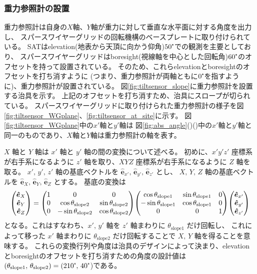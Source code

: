 \documentclass[../../main.tex]{subfiles}
\begin{document}
\subsubsection{重力参照計の設置}
\label{subsubsec:wg_tiltsensor_slope}
重力参照計は自身の$X$軸、$Y$軸が重力に対して垂直な水平面に対する角度を出力し、
スパースワイヤーグリッドの回転機構のベースプレートに取り付けられている。
SATはelevation(地表から天頂に向かう仰角)$50\tcdegree$での観測を主要としており、
スパースワイヤーグリッドはboresight(視線軸を中心とした回転角)$60\tcdegree$のオフセットを持って設置されている。
そのため、これらelevationとboresightのオフセットを打ち消すように
(つまり、重力参照計が両軸ともに$0\tcdegree$を指すように)、重力参照計が設置されている。
図\ref{fig:tiltsensor_slope}に重力参照計を設置する治具を示す。
上記のオフセットを打ち消すため、治具にスロープが切られている。
スパースワイヤーグリッドに取り付けられた重力参照計の様子を図\ref{fig:tiltsensor_WGplane}、\ref{fig:tiltsensor_at_site}に示す。
図\ref{fig:tiltsensor_WGplane}中の$x'$軸と$y'$軸は
図\ref{fig:abs_angle}()()中の$x'$軸と$y'$軸と同一のものであり、$X$軸と$Y$軸は重力参照計の軸を表す。

$X$ 軸と $Y$ 軸は $x'$ 軸と $y'$ 軸の間の変換について述べる。
初めに、$x'y'z'$ 座標系が右手系になるように $z'$ 軸を取り、$XYZ$ 座標系が右手系になるように $Z$ 軸を取る。
$x',\,y',\,z'$ 軸の基底ベクトルを $\bm{\hat{e}}_{x'},\,\bm{\hat{e}}_{y'},\,\bm{\hat{e}}_{z'}$ とし、
$X,\,Y,\,Z$ 軸の基底ベクトルを $\bm{\hat{e}}_{X},\,\bm{\hat{e}}_{Y},\,\bm{\hat{e}}_{Z}$ とする。
基底の変換は
\begin{equation}
    \label{eq:wg_tiltsensor_slope_trans}
    \mqty(\bm{\hat{e}}_{X} \\
          \bm{\hat{e}}_{Y} \\
          \bm{\hat{e}}_{Z}
          ) 
    = \mqty(1 & 0 & 0 \\
            0 & \cos\theta_{\mathrm{slope}2} & \sin\theta_{\mathrm{slope}2} \\
            0 & -\sin\theta_{\mathrm{slope}2} & \cos\theta_{\mathrm{slope}2}
            )
      \mqty(\cos\theta_{\mathrm{slope}1} & \sin\theta_{\mathrm{slope}1} & 0 \\
            -\sin\theta_{\mathrm{slope}1} & \cos\theta_{\mathrm{slope}1} & 0 \\
            0 & 0 & 1
            )
      \mqty(\bm{\hat{e}}_{x'} \\
            \bm{\hat{e}}_{y'} \\
            \bm{\hat{e}}_{z'}
            )
\end{equation}
となる。これはすなわち、$x',\,y'$ 軸を $z'$ 軸まわりに $\theta_{\mathrm{slope}1}$ だけ回転し、
これによって移った $x'$ 軸まわりに $\theta_{\mathrm{slope}2}$ だけ回転することで $X,\,Y$ 軸を得ることを意味する。
これらの変換行列や角度は治具のデザインによって決まり、elevationとboresightのオフセットを打ち消すための角度の設計値は
$(\theta_{\mathrm{slope}1},\,\theta_{\mathrm{slope}2}) = (210\tcdegree,\,40\tcdegree$)である。
\end{document}
